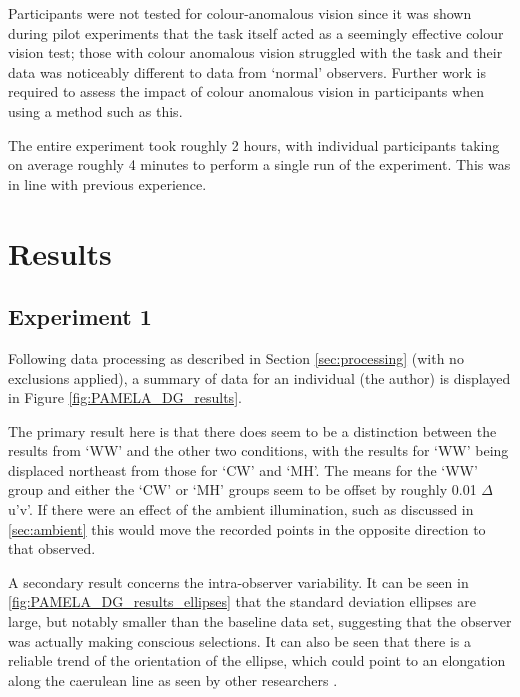 Participants were not tested for colour-anomalous vision since it was shown during pilot experiments that the task itself acted as a seemingly effective colour vision test; those with colour anomalous vision struggled with the task and their data was noticeably different to data from `normal' observers. Further work is required to assess the impact of colour anomalous vision in participants when using a method such as this. 

The entire experiment took roughly 2 hours, with individual participants taking on average roughly 4 minutes to perform a single run of the experiment. This was in line with previous experience.


\section{Results}

\subsection{Experiment 1}

Following data processing as described in Section \ref{sec:processing} (with no exclusions applied), a summary of data for an individual (the author) is displayed in Figure \ref{fig:PAMELA_DG_results}. 

The primary result here is that there does seem to be a distinction between the results from `WW' and the other two conditions, with the results for `WW' being displaced northeast from those for `CW' and `MH'. The means for the `WW' group and either the `CW' or `MH' groups seem to be offset by roughly 0.01 $\Delta$u'v'. If there were an effect of the ambient illumination, such as discussed in \ref{sec:ambient} this would move the recorded points in the opposite direction to that observed.

A secondary result concerns the intra-observer variability. It can be seen in \ref{fig:PAMELA_DG_results_ellipses} that the standard deviation ellipses are large, but notably smaller than the baseline data set, suggesting that the observer was actually making conscious selections. It can also be seen that there is a reliable trend of the orientation of the ellipse, which could point to an elongation along the caerulean line as seen by other researchers \citep{bosten_what_2015}. %

